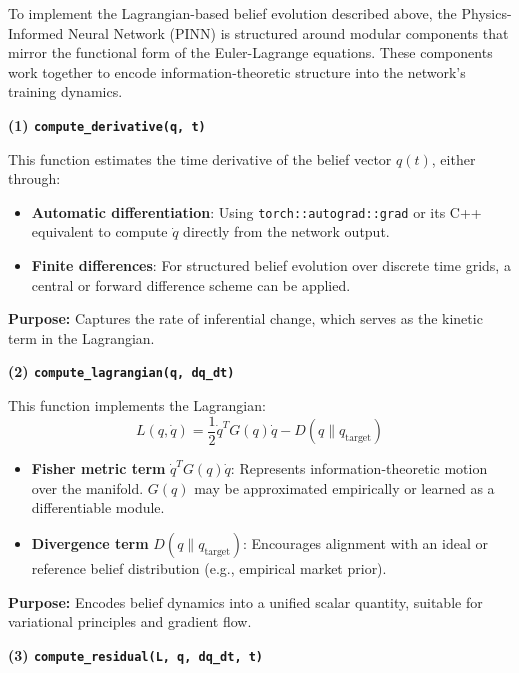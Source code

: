 To implement the Lagrangian-based belief evolution described above, the Physics-Informed Neural Network (PINN) is structured around modular components that mirror the functional form of the Euler-Lagrange equations. These components work together to encode information-theoretic structure into the network's training dynamics.

\vspace{0.5em}
\noindent\textbf{(1) \texttt{compute\_derivative(q, t)}}

This function estimates the time derivative of the belief vector $q(t)$, either through:

\begin{itemize}
    \item \textbf{Automatic differentiation}: Using \texttt{torch::autograd::grad} or its C++ equivalent to compute $\dot{q}$ directly from the network output.
    \item \textbf{Finite differences}: For structured belief evolution over discrete time grids, a central or forward difference scheme can be applied.
\end{itemize}

\textbf{Purpose:} Captures the rate of inferential change, which serves as the kinetic term in the Lagrangian.

\vspace{0.5em}
\noindent\textbf{(2) \texttt{compute\_lagrangian(q, dq\_dt)}}

This function implements the Lagrangian:
\[
L(q, \dot{q}) = \frac{1}{2} \dot{q}^T G(q) \dot{q} - D(q \parallel q_{\text{target}})
\]

\begin{itemize}
    \item \textbf{Fisher metric term} $\dot{q}^T G(q) \dot{q}$: Represents information-theoretic motion over the manifold. $G(q)$ may be approximated empirically or learned as a differentiable module.
    \item \textbf{Divergence term} $D(q \parallel q_{\text{target}})$: Encourages alignment with an ideal or reference belief distribution (e.g., empirical market prior).
\end{itemize}

\textbf{Purpose:} Encodes belief dynamics into a unified scalar quantity, suitable for variational principles and gradient flow.

\vspace{0.5em}
\noindent\textbf{(3) \texttt{compute\_residual(L, q, dq\_dt, t)}}

